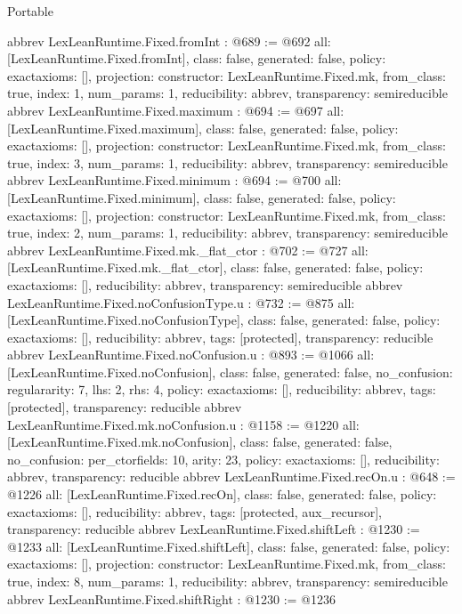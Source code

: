 \begin{lexlean}{Portable}
\begin{coremodule}
{}
abbrev LexLeanRuntime.Fixed.fromInt : @689 := @692 {
  all: [LexLeanRuntime.Fixed.fromInt],
  class: false,
  generated: false,
  policy: exact{axioms: []},
  projection: {constructor: LexLeanRuntime.Fixed.mk, from_class: true, index: 1, num_params: 1},
  reducibility: abbrev{},
  transparency: semireducible
}
abbrev LexLeanRuntime.Fixed.maximum : @694 := @697 {
  all: [LexLeanRuntime.Fixed.maximum],
  class: false,
  generated: false,
  policy: exact{axioms: []},
  projection: {constructor: LexLeanRuntime.Fixed.mk, from_class: true, index: 3, num_params: 1},
  reducibility: abbrev{},
  transparency: semireducible
}
abbrev LexLeanRuntime.Fixed.minimum : @694 := @700 {
  all: [LexLeanRuntime.Fixed.minimum],
  class: false,
  generated: false,
  policy: exact{axioms: []},
  projection: {constructor: LexLeanRuntime.Fixed.mk, from_class: true, index: 2, num_params: 1},
  reducibility: abbrev{},
  transparency: semireducible
}
abbrev LexLeanRuntime.Fixed.mk._flat_ctor : @702 := @727 {
  all: [LexLeanRuntime.Fixed.mk._flat_ctor],
  class: false,
  generated: false,
  policy: exact{axioms: []},
  reducibility: abbrev{},
  transparency: semireducible
}
abbrev LexLeanRuntime.Fixed.noConfusionType.{u} : @732 := @875 {
  all: [LexLeanRuntime.Fixed.noConfusionType],
  class: false,
  generated: false,
  policy: exact{axioms: []},
  reducibility: abbrev{},
  tags: [protected],
  transparency: reducible
}
abbrev LexLeanRuntime.Fixed.noConfusion.{u} : @893 := @1066 {
  all: [LexLeanRuntime.Fixed.noConfusion],
  class: false,
  generated: false,
  no_confusion: regular{arity: 7, lhs: 2, rhs: 4},
  policy: exact{axioms: []},
  reducibility: abbrev{},
  tags: [protected],
  transparency: reducible
}
abbrev LexLeanRuntime.Fixed.mk.noConfusion.{u} : @1158 := @1220 {
  all: [LexLeanRuntime.Fixed.mk.noConfusion],
  class: false,
  generated: false,
  no_confusion: per_ctor{fields: 10, arity: 23},
  policy: exact{axioms: []},
  reducibility: abbrev{},
  transparency: reducible
}
abbrev LexLeanRuntime.Fixed.recOn.{u} : @648 := @1226 {
  all: [LexLeanRuntime.Fixed.recOn],
  class: false,
  generated: false,
  policy: exact{axioms: []},
  reducibility: abbrev{},
  tags: [protected, aux_recursor],
  transparency: reducible
}
abbrev LexLeanRuntime.Fixed.shiftLeft : @1230 := @1233 {
  all: [LexLeanRuntime.Fixed.shiftLeft],
  class: false,
  generated: false,
  policy: exact{axioms: []},
  projection: {constructor: LexLeanRuntime.Fixed.mk, from_class: true, index: 8, num_params: 1},
  reducibility: abbrev{},
  transparency: semireducible
}
abbrev LexLeanRuntime.Fixed.shiftRight : @1230 := @1236 {
}
\end{coremodule}
\end{lexlean}
